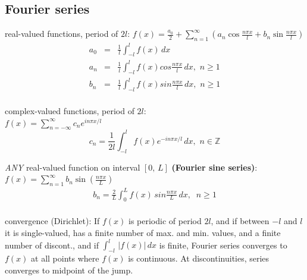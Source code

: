 \documentclass[letterpaper,landscape,10pt]{article}
\newenvironment{mydescription}
{\begin{description}
	\setlength{\itemsep}{0pt}
	\setlength{\parskip}{0pt}
	\setlength{\parsep}{-1pt}}
{\end{description}}
\begin{document}
{\begin{multicols}{4}
	\subsection*{Fourier series}
		\begin{mydescription}
			\item[real-valued functions, period of $2l$:]
			$ f(x) = \frac{a_0}{2} + \sum_{n=1}^\infty \left(
					a_n\cos \frac{n\pi x}{l} +
					b_n \sin \frac{n \pi x}{l}\right) $
			\begin{eqnarray*}
				a_0 &=& \frac{1}{l}\int_{-l}^{l} \! f(x) \, dx\\
				a_n &=& \frac{1}{l}\int_{-l}^{l} \!
					f(x) cos \frac{n\pi x}{l} \, dx, \,\, n \geq 1\\
				b_n &=& \frac{1}{l}\int_{-l}^{l} \!
					f(x)sin \frac{n\pi x}{l} \, dx, \,\, n \geq 1\\
			\end{eqnarray*}
			\item[complex-valued functions,]
				period of $2l$: \\
				$ f(x) = \sum_{n=-\infty}^{\infty} c_n e^{in\pi x/l} $
				$$
					c_n = \frac{1}{2l}\int_{-l}^{l} \! f(x)e^{-in\pi x/l} \, dx,
						\,\, n \in \mathbb{Z}
				$$
			  \item[\textit{ANY} real-valued function] on interval $[0,\,L]$ \textbf{(Fourier sine series)}:
			$ f(x) = \sum_{n=1}^\infty b_n \sin \left( \frac{n \pi x}{L}\right) $
			\begin{eqnarray*}
				b_n = \frac{2}{L}\int_{0}^{L} \! f(x)\,sin \frac{n\pi x}{L} \, dx, \;\; n \geq 1\\
			\end{eqnarray*}
			\item[convergence]
				(Dirichlet): 
				If $f(x)$ is periodic of period $2 l$, and if between $-l$ and
				$l$ it is single-valued, has a finite number of max. and min.
				values, and a finite number of discont., and if
				$\int_{-l}^{l} \, |f(x)| \, dx$ is finite, Fourier series
				converges to $f(x)$ at all points where $f(x)$ is continuous.
				At discontinuities, series converges to midpoint of the jump.\\
		\end{mydescription}

\end{multicols}}
\end{document}
